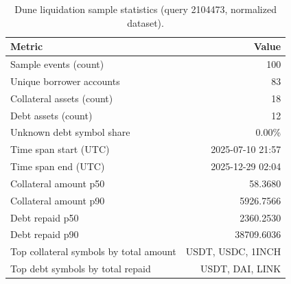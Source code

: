 \begin{table}[h!]
\centering
\caption{Dune liquidation sample statistics (query 2104473, normalized dataset).}
\label{tab:liquidation_sample_stats}
\begin{tabular}{@{}lr@{}}
\toprule
Metric & Value \\
\midrule
Sample events (count) & 100 \\
Unique borrower accounts & 83 \\
Collateral assets (count) & 18 \\
Debt assets (count) & 12 \\
Unknown debt symbol share & 0.00\% \\
Time span start (UTC) & 2025-07-10 21:57 \\
Time span end (UTC) & 2025-12-29 02:04 \\
Collateral amount p50 & 58.3680 \\
Collateral amount p90 & 5926.7566 \\
Debt repaid p50 & 2360.2530 \\
Debt repaid p90 & 38709.6036 \\
Top collateral symbols by total amount & USDT, USDC, 1INCH \\
Top debt symbols by total repaid & USDT, DAI, LINK \\
\bottomrule
\end{tabular}
\end{table}
